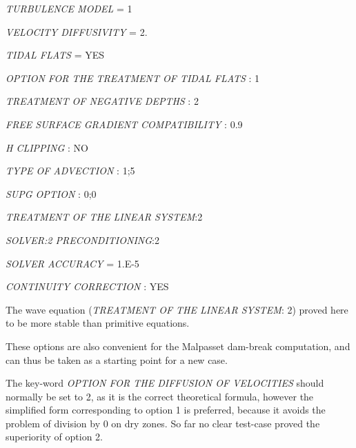  \textit{TURBULENCE MODEL} = 1

 \textit{VELOCITY DIFFUSIVITY} = 2.

 \textit{TIDAL FLATS} = YES

 \textit{OPTION FOR THE TREATMENT OF TIDAL FLATS} : 1

 \textit{TREATMENT OF NEGATIVE DEPTHS} : 2

 \textit{FREE SURFACE GRADIENT COMPATIBILITY} : 0.9

 \textit{H CLIPPING} : NO

 \textit{TYPE OF ADVECTION} : 1;5

 \textit{SUPG OPTION} :       0;0

 \textit{TREATMENT OF THE LINEAR SYSTEM}:2

 \textit{SOLVER:2 PRECONDITIONING}:2

 \textit{SOLVER ACCURACY} = 1.E-5

 \textit{CONTINUITY CORRECTION} : YES

 The wave equation (\textit{TREATMENT OF THE LINEAR SYSTEM}: 2) proved here to be more stable than primitive equations.

 These options are also convenient for the Malpasset dam-break computation, and can thus be taken as a starting point for a new case.

 The key-word \textit{OPTION FOR THE DIFFUSION OF VELOCITIES} should normally be set to 2, as it is the correct theoretical formula, however the simplified form corresponding to option 1 is preferred, because it avoids the problem of division by 0 on dry zones. So far no clear test-case proved the superiority of option 2.


